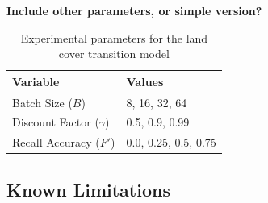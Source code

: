 \textbf{Include other parameters, or simple version?}

\begin{table}
\caption{Experimental parameters for the land cover transition model}
\centering
\begin{tabular}{ll}
\hline
\hline
    Variable & Values \\
    \hline
    Batch Size ($B$) & 8, 16, 32, 64 \\
    Discount Factor ($\gamma$) & 0.5, 0.9, 0.99 \\
    Recall Accuracy ($F'$) & 0.0, 0.25, 0.5, 0.75 \\
    \hline
\end{tabular}
\end{table}

% 
% 
% 
% 

\subsection{Known Limitations}
\label{sec:land_lim}

